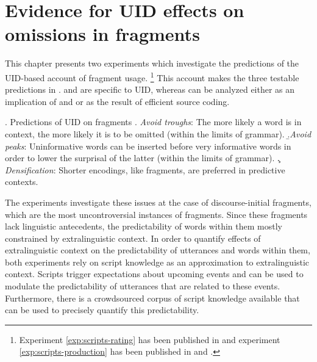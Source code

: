 \chapter{Evidence for UID effects on omissions in fragments}
\label{sec:chapter-infotheory-experiments}

This chapter presents two experiments which investigate the predictions of the UID-based account of fragment usage.%
%
\footnote{Experiment \ref{exp:scripts-rating} has been published in \citet{lemke.etal2021} and experiment \ref{exp:scripts-production} has been published in \citet{lemke.etal2020} and \citet{lemke.etal2021a}.}\afterfn%
%
This account makes the three testable predictions in \Next. \Next[a] and \Next[b] are specific to UID, whereas \Next[c] can be analyzed either as an implication of \Next[a] and \Next[b] or as the result of efficient source coding.

\ex. Predictions of UID on fragments
\a. \textit{Avoid troughs}: The more likely a word is in context, the more likely it is to be omitted (within the limits of grammar).\label{ex:uid-pred-troughs}
 \b.\textit{Avoid peaks}: Uninformative words can be inserted before very informative words in order to lower the surprisal of the latter (within the limits of grammar). \label{ex:uid-pred-peaks}
 \c. \textit{Densification}: Shorter encodings, like fragments, are preferred in predictive contexts.\label{ex:uid-pred-density}

The experiments investigate these issues at the case of discourse-initial fragments, which are the most uncontroversial instances of fragments. Since these fragments lack linguistic antecedents, the predictability of words within them mostly constrained by extralinguistic context. In order to quantify effects of extralinguistic context on the predictability of utterances and words within them,  both experiments rely on script knowledge \citep{schank.abelson1977} as an approximation to extralinguistic context. Scripts trigger expectations about upcoming events and can be used to modulate the predictability of utterances that are related to these events. Furthermore, there is a crowdsourced corpus of script knowledge available that can be used to precisely quantify this predictability. 

